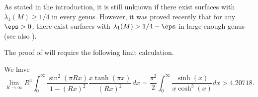 \documentclass[12pt]{amsart}
\numberwithin{equation}{section}
\begin{document}
\begin{rem}
As stated in the introduction, it is still unknown if there exist surfaces with $\lambda_1(M) \geq 1/4$ in every genus. However, it was proved recently that for any $\eps>0$, there exist surfaces with $\lambda_1(M) > 1/4 - \eps$ in large enough genus \cite{HideMagee} (see also \cite{AnantharamanMonk2,polynomial_rate,MageePudervanHandel}).
\end{rem}

The proof of  will require the following limit calculation.

\begin{lem} \label{lem:limit}
We have
\[
\lim_{R\to \infty} R^4 \int_0^\infty \frac{\sin^2(\pi R x)}{1 -(Rx)^2} \frac{x \tanh(\pi x)}{(R x)^2}\,dx = \frac{\pi^2}{2}\int_0^\infty \frac{\sinh(x)}{x\cosh^3(x)}dx > 4.20718.
\]
\end{lem}
\end{document}
